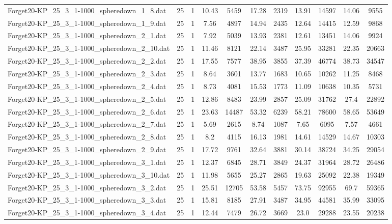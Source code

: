 \begin{table}[!ht]
\begin{tabular}{lcccccccccc}
Forget20-KP\_25\_3\_1-1000\_spheredown\_1\_8.dat & 25 & 1 & 10.43 & 5459 & 17.28 & 2319 & 13.91 & 14597 & 14.06 & 9555 \\
Forget20-KP\_25\_3\_1-1000\_spheredown\_1\_9.dat & 25 & 1 & 7.56 & 4897 & 14.94 & 2435 & 12.64 & 14415 & 12.59 & 9868 \\
Forget20-KP\_25\_3\_1-1000\_spheredown\_2\_1.dat & 25 & 1 & 7.92 & 5039 & 13.93 & 2381 & 12.61 & 13451 & 14.06 & 9924 \\
Forget20-KP\_25\_3\_1-1000\_spheredown\_2\_10.dat & 25 & 1 & 11.46 & 8121 & 22.14 & 3487 & 25.95 & 33281 & 22.35 & 20663 \\
Forget20-KP\_25\_3\_1-1000\_spheredown\_2\_2.dat & 25 & 1 & 17.55 & 7577 & 38.95 & 3855 & 37.39 & 46774 & 38.73 & 34547 \\
Forget20-KP\_25\_3\_1-1000\_spheredown\_2\_3.dat & 25 & 1 & 8.64 & 3601 & 13.77 & 1683 & 10.65 & 10262 & 11.25 & 8468 \\
Forget20-KP\_25\_3\_1-1000\_spheredown\_2\_4.dat & 25 & 1 & 8.73 & 4081 & 15.53 & 1773 & 11.09 & 10638 & 10.35 & 5731 \\
Forget20-KP\_25\_3\_1-1000\_spheredown\_2\_5.dat & 25 & 1 & 12.86 & 8483 & 23.99 & 2857 & 25.09 & 31762 & 27.4 & 22892 \\
Forget20-KP\_25\_3\_1-1000\_spheredown\_2\_6.dat & 25 & 1 & 23.63 & 14487 & 53.32 & 6239 & 58.21 & 78600 & 58.65 & 53649 \\
Forget20-KP\_25\_3\_1-1000\_spheredown\_2\_7.dat & 25 & 1 & 5.69 & 2615 & 8.74 & 1087 & 7.65 & 6095 & 7.57 & 4661 \\
Forget20-KP\_25\_3\_1-1000\_spheredown\_2\_8.dat & 25 & 1 & 8.2 & 4115 & 16.13 & 1981 & 14.61 & 14529 & 14.67 & 10303 \\
Forget20-KP\_25\_3\_1-1000\_spheredown\_2\_9.dat & 25 & 1 & 17.72 & 9761 & 32.64 & 3881 & 30.14 & 38724 & 34.25 & 29054 \\
Forget20-KP\_25\_3\_1-1000\_spheredown\_3\_1.dat & 25 & 1 & 12.37 & 6845 & 28.71 & 3849 & 24.37 & 31964 & 28.72 & 26486 \\
Forget20-KP\_25\_3\_1-1000\_spheredown\_3\_10.dat & 25 & 1 & 11.98 & 5655 & 25.27 & 2865 & 19.63 & 25092 & 22.38 & 19349 \\
Forget20-KP\_25\_3\_1-1000\_spheredown\_3\_2.dat & 25 & 1 & 25.51 & 12705 & 53.58 & 5457 & 73.75 & 92955 & 69.7 & 59365 \\
Forget20-KP\_25\_3\_1-1000\_spheredown\_3\_3.dat & 25 & 1 & 15.81 & 8185 & 27.91 & 3487 & 34.95 & 44581 & 35.99 & 33095 \\
Forget20-KP\_25\_3\_1-1000\_spheredown\_3\_4.dat & 25 & 1 & 12.44 & 7479 & 26.72 & 3669 & 23.0 & 29288 & 23.55 & 20238 \\

\end{tabular}
\end{table}

